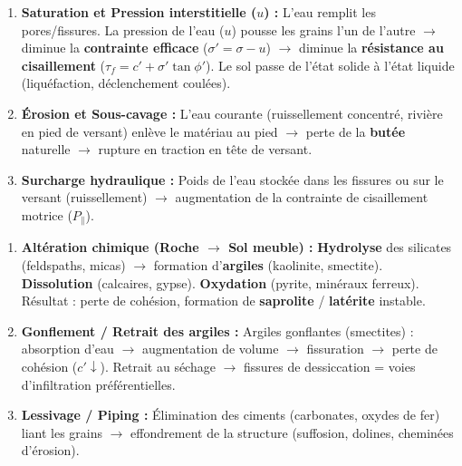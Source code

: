 \documentclass[11pt]{article}
\begin{document}
\begin{propriete}
    \begin{enumerate}
        \item \textbf{Saturation et Pression interstitielle ($u$) :} L'eau remplit les pores/fissures. La pression de l'eau ($u$) pousse les grains l'un de l'autre $\rightarrow$ diminue la \textbf{contrainte efficace} ($\sigma' = \sigma - u$) $\rightarrow$ diminue la \textbf{résistance au cisaillement} ($\tau_f = c' + \sigma' \tan \phi'$). Le sol passe de l'état solide à l'état liquide (liquéfaction, déclenchement coulées).
        \item \textbf{Érosion et Sous-cavage :} L'eau courante (ruissellement concentré, rivière en pied de versant) enlève le matériau au pied $\rightarrow$ perte de la \textbf{butée} naturelle $\rightarrow$ rupture en traction en tête de versant.
        \item \textbf{Surcharge hydraulique :} Poids de l'eau stockée dans les fissures ou sur le versant (ruissellement) $\rightarrow$ augmentation de la contrainte de cisaillement motrice ($P_{\parallel}$).
    \end{enumerate}
\end{propriete}

\begin{propriete}
    \begin{enumerate}
        \item \textbf{Altération chimique (Roche $\rightarrow$ Sol meuble) :} \textbf{Hydrolyse} des silicates (feldspaths, micas) $\rightarrow$ formation d'\textbf{argiles} (kaolinite, smectite). \textbf{Dissolution} (calcaires, gypse). \textbf{Oxydation} (pyrite, minéraux ferreux). Résultat : perte de cohésion, formation de \textbf{saprolite} / \textbf{latérite} instable.
        \item \textbf{Gonflement / Retrait des argiles :} Argiles gonflantes (smectites) : absorption d'eau $\rightarrow$ augmentation de volume $\rightarrow$ fissuration $\rightarrow$ perte de cohésion ($c' \downarrow$). Retrait au séchage $\rightarrow$ fissures de dessiccation = voies d'infiltration préférentielles.
        \item \textbf{Lessivage / Piping :} Élimination des ciments (carbonates, oxydes de fer) liant les grains $\rightarrow$ effondrement de la structure (suffosion, dolines, cheminées d'érosion).
    \end{enumerate}
\end{propriete}
\end{document}
